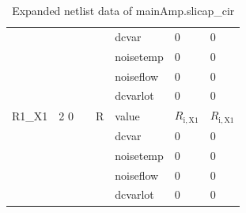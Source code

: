 \begin{table}[h]
\begin{tabular}[c]{lllllll}
\rowcolor{myyellow}
 & & & &\small{dcvar} &$0$ &$0$ \\ 
 & & & &\small{noisetemp} &$0$ &$0$ \\ 
\rowcolor{myyellow}
 & & & &\small{noiseflow} &$0$ &$0$ \\ 
 & & & &\small{dcvarlot} &$0$ &$0$ \\ 
\rowcolor{myyellow}
\small{R1\_X1} &\small{2 0 } & &\small{R} &\small{value} &$R_{\mathrm{i},\mathrm{X1}}$ &$R_{\mathrm{i},\mathrm{X1}}$ \\ 
 & & & &\small{dcvar} &$0$ &$0$ \\ 
\rowcolor{myyellow}
 & & & &\small{noisetemp} &$0$ &$0$ \\ 
 & & & &\small{noiseflow} &$0$ &$0$ \\ 
\rowcolor{myyellow}
 & & & &\small{dcvarlot} &$0$ &$0$ \\ 
\end{tabular}
\caption{Expanded netlist data of mainAmp.slicap_cir}
\end{table}

